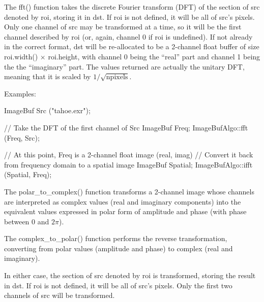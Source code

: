 The {\cf fft()} function takes the discrete Fourier transform (DFT) of
the section of {\cf src} denoted by {\cf roi}, storing it in {\cf dst}.
If {\cf roi} is not defined, it will be all of {\cf src}'s pixels.  Only
one channel of {\cf src} may be transformed at a time, so it will be the
first channel described by {\cf roi} (or, again, channel 0 if {\cf roi}
is undefined).  If not already in the correct format, {\cf dst} will be
re-allocated to be a 2-channel {\cf float} buffer of size 
{\cf roi.width()} $\times$ {\cf roi.height}, with channel 0 being the
``real'' part and channel 1 being the the ``imaginary'' part.  The
values returned are actually the unitary DFT, meaning that it is scaled
by $1/\sqrt{\mathrm{npixels}}$.

\smallskip
\noindent Examples:
\begin{code}
    ImageBuf Src ("tahoe.exr");

    // Take the DFT of the first channel of Src
    ImageBuf Freq;
    ImageBufAlgo::fft (Freq, Src);

    // At this point, Freq is a 2-channel float image (real, imag)
    // Convert it back from frequency domain to a spatial image
    ImageBuf Spatial;
    ImageBufAlgo::ifft (Spatial, Freq);
\end{code}
\apiend

 
 

The {\cf polar_to_complex()} function transforms a 2-channel image whose
channels are interpreted as complex values (real and imaginary components)
into the equivalent values expressed in polar form of amplitude and phase
(with phase between $0$ and $2\pi$).

The {\cf complex_to_polar()} function performs the reverse transformation,
converting from  polar values (amplitude and phase) to complex (real and
imaginary).

In either case,  the section of {\cf src} denoted by {\cf roi} is
transformed, storing the result in {\cf dst}. If {\cf roi} is not defined,
it will be all of {\cf src}'s pixels.  Only the first two channels of {\cf
src} will be transformed.

